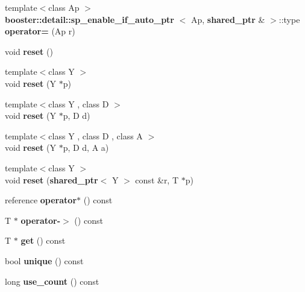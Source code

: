 \begin{DoxyCompactItemize}
\item 
{\footnotesize template$<$class Ap $>$ }\\{\bf booster\-::detail\-::sp\-\_\-enable\-\_\-if\-\_\-auto\-\_\-ptr}\*
$<$ \-Ap, {\bf shared\-\_\-ptr} \& $>$\-::type {\bfseries operator=} (\-Ap r)\label{classbooster_1_1shared__ptr_af5a66535e99a277e8978907cca6fff94}

\item 
void {\bfseries reset} ()\label{classbooster_1_1shared__ptr_a717dbef22f028012e7add2674b87729d}

\item 
{\footnotesize template$<$class Y $>$ }\\void {\bfseries reset} (\-Y $\ast$p)\label{classbooster_1_1shared__ptr_a4f4524d782c5e6a87ba28607bc99674e}

\item 
{\footnotesize template$<$class Y , class D $>$ }\\void {\bfseries reset} (\-Y $\ast$p, \-D d)\label{classbooster_1_1shared__ptr_aa04c7a4f022b560408d66518b7c116ff}

\item 
{\footnotesize template$<$class Y , class D , class A $>$ }\\void {\bfseries reset} (\-Y $\ast$p, \-D d, \-A a)\label{classbooster_1_1shared__ptr_acff6191062f3a6ba1c4cf4bb8477ea11}

\item 
{\footnotesize template$<$class Y $>$ }\\void {\bfseries reset} ({\bf shared\-\_\-ptr}$<$ \-Y $>$ const \&r, \-T $\ast$p)\label{classbooster_1_1shared__ptr_a982b7dd9a9897bc539194c0a69f56851}

\item 
reference {\bfseries operator$\ast$} () const \label{classbooster_1_1shared__ptr_a41d1cb065b9e10152333148be2124d59}

\item 
\-T $\ast$ {\bfseries operator-\/$>$} () const \label{classbooster_1_1shared__ptr_ab2f5866801861c8a80468d28be225459}

\item 
\-T $\ast$ {\bfseries get} () const \label{classbooster_1_1shared__ptr_a0b3b71ea33c2284ae4fc52c350ff19b4}

\item 
bool {\bfseries unique} () const \label{classbooster_1_1shared__ptr_a852bb19a9dbba89a526c3f10bee70489}

\item 
long {\bfseries use\-\_\-count} () const \label{classbooster_1_1shared__ptr_a99907f1bd1bc3b992d091b78455ca17c}


\end{DoxyCompactItemize}

